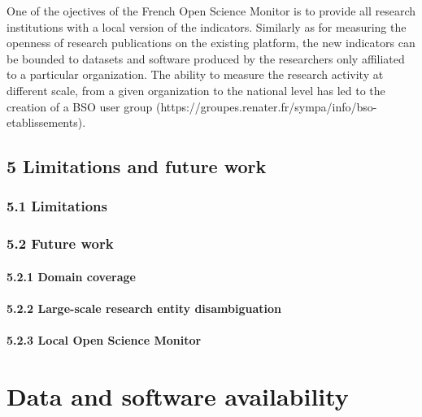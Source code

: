 \documentclass[
]{article}
\begin{document}
One of the ojectives of the French Open Science Monitor is to provide
all research institutions with a local version of the indicators.
Similarly as for measuring the openness of research publications on the
existing platform, the new indicators can be bounded to datasets and
software produced by the researchers only affiliated to a particular
organization. The ability to measure the research activity at different
scale, from a given organization to the national level has led to the
creation of a BSO user group
(https://groupes.renater.fr/sympa/info/bso-etablissements).

\hypertarget{limitations-and-future-work}{%
\subsection{5 Limitations and future
work}\label{limitations-and-future-work}}

\hypertarget{limitations}{%
\subsubsection{5.1 Limitations}\label{limitations}}

\hypertarget{future-work}{%
\subsubsection{5.2 Future work}\label{future-work}}

\hypertarget{domain-coverage}{%
\paragraph{5.2.1 Domain coverage}\label{domain-coverage}}

\hypertarget{large-scale-research-entity-disambiguation}{%
\paragraph{5.2.2 Large-scale research entity
disambiguation}\label{large-scale-research-entity-disambiguation}}

\hypertarget{local-open-science-monitor}{%
\paragraph{5.2.3 Local Open Science
Monitor}\label{local-open-science-monitor}}

\hypertarget{data-and-software-availability}{%
\section{Data and software
availability}\label{data-and-software-availability}}
\end{document}
